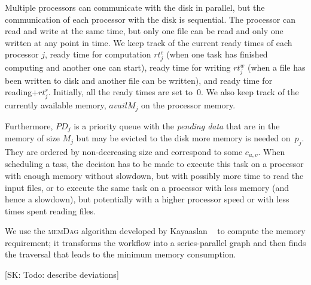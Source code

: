 \documentclass[conference]{IEEEtran}
\newcommand{\algo}[1]{\textsc{#1}}
\newcommand{\MM}{M}
\newcommand{\rt}{rt}
\newcommand{\PD}{PD}
\newcommand{\skug}[1]{{\color{blue}[SK: #1]}}
\begin{document}
Multiple processors can communicate with the disk in parallel, but the communication of each processor  with the disk is sequential.
The processor can read and write at the same time, but only one file can be read and only one written at any point in time.
We keep track of the current ready times of each processor $j$, ready time for computation $\rt_j^c$ (when one task has finished
computing and another one can start),
ready time for writing $\rt_j^w$ (when a file has been written to disk and another file can be written), and ready time for
 reading+$\rt_j^r$.
Initially, all the ready times are set to~$0$.
We also keep track of the currently available memory, $availM_j$ on the processor memory.

Furthermore, $\PD_j$ is a priority queue with the {\em pending data}
that are in the memory of size $\MM_j$ but may be evicted to the disk
more memory is needed on~$p_j$.
They are ordered by non-decreasing size and correspond to some $c_{u,v}$.
When scheduling a tass, the decision has to be made to execute this task on a processor with enough memory
    without slowdown, but with possibly more time to read the input files, or to execute the same task
    on a processor with less memory (and hence a slowdown), but potentially with a higher processor speed or with less times
    spent reading files.



We use the \algo{memDag} algorithm developed by Kayaaslan \etal~\cite{KAYAASLAN20181} to compute
the memory requirement; it transforms the workflow into a series-parallel graph
and then finds the traversal that leads to the minimum memory consumption.

\skug{Todo: describe deviations}
\end{document}
